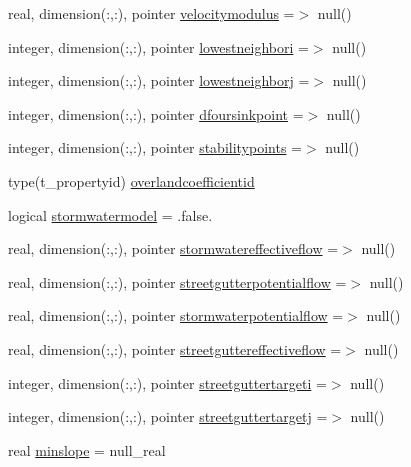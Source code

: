 \begin{DoxyCompactItemize}
real, dimension(\+:,\+:), pointer \mbox{\hyperlink{structmodulerunoff_1_1t__runoff_a9a3dbef4833492c548078e7cbb47c4f1}{velocitymodulus}} =$>$ null()
\item 
integer, dimension(\+:,\+:), pointer \mbox{\hyperlink{structmodulerunoff_1_1t__runoff_a44d937c36d4dad96ed42aedc2c59bede}{lowestneighbori}} =$>$ null()
\item 
integer, dimension(\+:,\+:), pointer \mbox{\hyperlink{structmodulerunoff_1_1t__runoff_a59594f2828bc262de856dcd69a63edfd}{lowestneighborj}} =$>$ null()
\item 
integer, dimension(\+:,\+:), pointer \mbox{\hyperlink{structmodulerunoff_1_1t__runoff_ac04892a641f2c68f5e8bc23e9abe6f97}{dfoursinkpoint}} =$>$ null()
\item 
integer, dimension(\+:,\+:), pointer \mbox{\hyperlink{structmodulerunoff_1_1t__runoff_a25712629e5db7e466e16cd92e6131c33}{stabilitypoints}} =$>$ null()
\item 
type(t\+\_\+propertyid) \mbox{\hyperlink{structmodulerunoff_1_1t__runoff_a8247870adea77731f864f2204914e7e6}{overlandcoefficientid}}
\item 
logical \mbox{\hyperlink{structmodulerunoff_1_1t__runoff_a59e031c1571339f6e29026644c41f3fa}{stormwatermodel}} = .false.
\item 
real, dimension(\+:,\+:), pointer \mbox{\hyperlink{structmodulerunoff_1_1t__runoff_a03e6b6d0ba4e0703df24dfff9ea56cd5}{stormwatereffectiveflow}} =$>$ null()
\item 
real, dimension(\+:,\+:), pointer \mbox{\hyperlink{structmodulerunoff_1_1t__runoff_abbc9d0338245bca27796a9c0a8bb6e4f}{streetgutterpotentialflow}} =$>$ null()
\item 
real, dimension(\+:,\+:), pointer \mbox{\hyperlink{structmodulerunoff_1_1t__runoff_a7ea909a3b781ac6d26193fbdaac4859c}{stormwaterpotentialflow}} =$>$ null()
\item 
real, dimension(\+:,\+:), pointer \mbox{\hyperlink{structmodulerunoff_1_1t__runoff_ae34d9b85d401dbd2d2e0029f7dbc1715}{streetguttereffectiveflow}} =$>$ null()
\item 
integer, dimension(\+:,\+:), pointer \mbox{\hyperlink{structmodulerunoff_1_1t__runoff_adb873b70afa3605bd1af16a60f29c994}{streetguttertargeti}} =$>$ null()
\item 
integer, dimension(\+:,\+:), pointer \mbox{\hyperlink{structmodulerunoff_1_1t__runoff_ae09252af96bec7019defd1386e9ad78a}{streetguttertargetj}} =$>$ null()
\item 
real \mbox{\hyperlink{structmodulerunoff_1_1t__runoff_abc91c3e930d2c3524789d1958f50db05}{minslope}} = null\+\_\+real

\end{DoxyCompactItemize}
